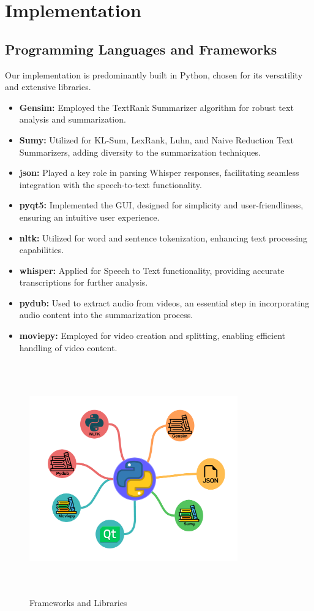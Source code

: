 \documentclass{ieeeaccess}
\begin{document}
\section{Implementation}
\label{Implementation}
\subsection{Programming Languages and Frameworks}

Our implementation is predominantly built in Python, chosen for its versatility and extensive libraries.

\begin{itemize}
    \item \textbf{Gensim:} Employed the TextRank Summarizer algorithm for robust text analysis and summarization.
    \item \textbf{Sumy:} Utilized for KL-Sum, LexRank, Luhn, and Naive Reduction Text Summarizers, adding diversity to the summarization techniques.
    \item \textbf{json:} Played a key role in parsing Whisper responses, facilitating seamless integration with the speech-to-text functionality.
    \item \textbf{pyqt5:} Implemented the GUI, designed for simplicity and user-friendliness, ensuring an intuitive user experience.
    \item \textbf{nltk:} Utilized for word and sentence tokenization, enhancing text processing capabilities.
    \item \textbf{whisper:} Applied for Speech to Text functionality, providing accurate transcriptions for further analysis.
    \item \textbf{pydub:} Used to extract audio from videos, an essential step in incorporating audio content into the summarization process.
    \item \textbf{moviepy:} Employed for video creation and splitting, enabling efficient handling of video content.
\end{itemize}

\begin{figure}	[!htb]
    \centering
    \includegraphics[width=9cm, height=10cm, keepaspectratio]{DevelopmentLibraries.png}
    \caption{Frameworks and Libraries}
    \label{frameworks_and_libraries}
\end{figure} 
\end{document}
